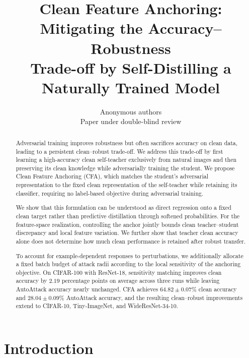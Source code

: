\documentclass{article} %
\title{Clean Feature Anchoring: Mitigating the Accuracy--Robustness\\
Trade-off by Self-Distilling a Naturally Trained Model}
\author{
Anonymous authors\\
Paper under double-blind review
}
\theoremstyle{plain}
\begin{document}
\maketitle

\begin{abstract}

Adversarial training improves robustness but often sacrifices accuracy on
clean data, leading to a persistent clean--robust trade-off.
We address this trade-off by first learning a high-accuracy clean
self-teacher exclusively from natural images and then preserving its clean
knowledge while adversarially training the student.
We propose Clean Feature Anchoring (CFA), which matches the student's
adversarial representation to the fixed clean representation of the
self-teacher while retaining its classifier, requiring no label-based
objective during adversarial training.

We show that this formulation can be understood as direct regression onto a
fixed clean target rather than predictive distillation through softened
probabilities.
For the feature-space realization, controlling the anchor jointly bounds
clean teacher--student discrepancy and local feature variation.
We further show that teacher clean accuracy alone does not determine how much
clean performance is retained after robust transfer.

To account for example-dependent responses to perturbations, we additionally
allocate a fixed batch budget of attack radii according to the local
sensitivity of the anchoring objective.
On CIFAR-100 with ResNet-18, sensitivity matching improves clean accuracy by
\(2.19\) percentage points on average across three runs while leaving
AutoAttack accuracy nearly unchanged.
CFA achieves \(64.82\mathbin{\pm}0.07\%\) clean accuracy and
\(28.04\mathbin{\pm}0.09\%\) AutoAttack accuracy, and the resulting
clean--robust improvements extend to CIFAR-10, Tiny-ImageNet, and
WideResNet-34-10.

\end{abstract}

\section{Introduction}
\label{sec:intro}
\end{document}
